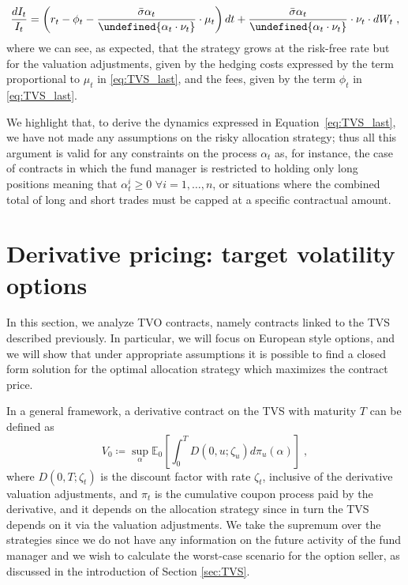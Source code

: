 \documentclass[runningheads]{m2ef}
\let\norm\undefined %
\DeclarePairedDelimiter\norm{\lVert}{\rVert}
\begin{document}
	\begin{equation}
		\frac{dI_t}{I_t} = \left(r_t -  \phi_t     - \frac{\bar{\sigma} \alpha_t}{\norm {\alpha_t \cdot \nu_t }}  \cdot \mu_t \right)dt+ \frac{\bar{\sigma}\alpha_t }{\norm{ \alpha_t \cdot \nu_t }} \cdot \nu_t \cdot dW_t \; ,
	\label{eq:TVS_last}\end{equation}
	where we can see, as expected, that the strategy grows at the risk-free rate but for the valuation adjustments, given by the hedging costs expressed by the term proportional to $\mu_t$ in \eqref{eq:TVS_last}, and the fees, given by the term $\phi_t$ in \eqref{eq:TVS_last}.

	We highlight that, to derive the dynamics expressed in Equation~\eqref{eq:TVS_last}, we have not made any assumptions on the risky allocation strategy; thus all this argument is valid for any constraints on the process $\alpha_t$ as, for instance, the case of contracts in which the fund manager is restricted to holding only long positions meaning that $\alpha_t^i\geq0$ $\forall i = 1,\dots,n$, or situations where the combined total of long and short trades must be capped at a specific contractual amount.


	\section{Derivative pricing: target volatility options}\label{sec:Derivative}
	In this section, we analyze TVO contracts, namely contracts linked to the TVS described previously. In particular, we will focus on European style options, and we will show that under appropriate assumptions it is possible to find a closed form solution for the optimal allocation strategy which maximizes the contract price.

	In a general framework, a derivative contract on the TVS with maturity $T$ can be defined as
	\begin{equation}
		V_0 \coloneqq \sup_\alpha \mathbb{E}_0\left[\int_0^T D(0,u;\zeta_u)d\pi_u(\alpha)\right] \; ,
	\end{equation}
	where $D(0,T;\zeta_t)$ is the discount factor with rate $\zeta_t$, inclusive of the derivative valuation adjustments, and $\pi_t$ is the cumulative coupon process paid by the derivative, and it depends on the allocation strategy since in turn the TVS depends on it via the valuation adjustments. We take the supremum over the strategies since we do not have any information on the future activity of the fund manager and we wish to calculate the worst-case scenario for the option seller, as discussed in the introduction of Section \ref{sec:TVS}.
\end{document}

